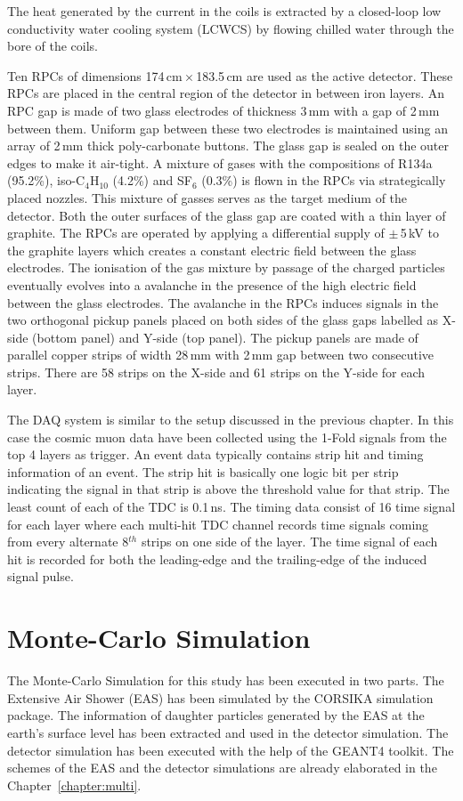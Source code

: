 The heat generated by the current in the
coils is extracted by a closed-loop low conductivity water cooling
system (LCWCS) by flowing chilled water through the bore of the coils.

Ten RPCs of dimensions 174\,cm\,$\times$\,183.5\,cm are used as the
active detector. These RPCs are placed in the central region of
the detector in between iron layers.
An RPC gap is made of two glass electrodes of thickness 3\,mm with
a gap of 2\,mm between them. Uniform gap between these two electrodes
is maintained using an array of 2\,mm thick poly-carbonate buttons.
The glass gap is sealed on the outer edges to make it air-tight.
A mixture of gases with the compositions of R134a (95.2\%),
iso-C$_4$H$_{10}$ (4.2\%) and SF$_6$ (0.3\%) is flown in the RPCs
via strategically placed nozzles. This mixture of gasses serves as the
target medium of the detector.
Both the outer surfaces of the glass gap are coated with a thin layer
of graphite. The RPCs are operated by applying a differential supply of
$\pm$\,5\,kV to the graphite layers which creates a constant electric
field between the glass electrodes. The ionisation of the gas mixture
by passage of the charged particles eventually evolves into a
avalanche in the presence of the high electric field between the glass
electrodes. The avalanche in the RPCs induces signals in the two
orthogonal pickup panels placed on both sides of the glass gaps
labelled as X-side (bottom panel) and Y-side (top panel). The pickup panels
  are made of parallel
copper strips of width 28\,mm with 2\,mm gap between two consecutive
strips. There are 58 strips on the X-side and 61 strips on the
Y-side for each layer.

The DAQ system is similar to the setup discussed in the previous
chapter. In this case the cosmic muon data have been collected using
the 1-Fold signals from the top 4 layers as trigger.
An event data typically contains strip hit and timing information
of an event. The strip hit is basically one logic bit per strip
indicating the signal in that strip is above the threshold value
for that strip. The least count of each of the TDC is 0.1\,ns.
The timing data consist of 16 time signal for
each layer where each multi-hit TDC channel records time signals
coming from every alternate 8$^{th}$ strips on one side of the layer.
The time signal of each hit is recorded for both the leading-edge and
the trailing-edge of the induced signal pulse.

\section{Monte-Carlo Simulation}
The Monte-Carlo Simulation for this study has been executed in
two parts. The Extensive Air Shower (EAS) has been simulated
by the CORSIKA simulation package\cite{corsika763}. The information
of daughter particles generated by the EAS at the earth's surface
level has been extracted and used in the detector simulation.
The detector simulation has been executed with the help
of the GEANT4 toolkit\cite{geant4}. The schemes of the EAS and the
detector simulations are already elaborated in the
Chapter~\ref{chapter:multi}.

